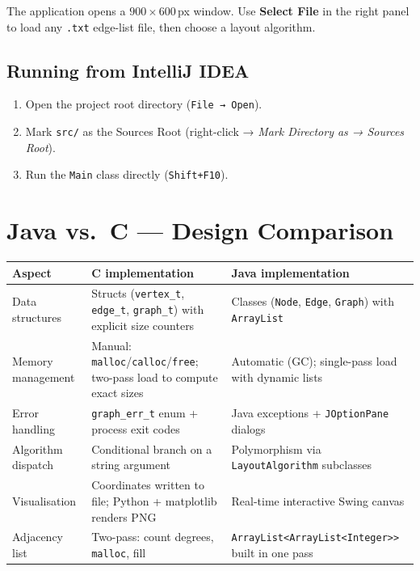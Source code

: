 \documentclass[12pt,a4paper]{article}
\begin{document}
The application opens a $900 \times 600$\,px window. Use
\textbf{Select File} in the right panel to load any \texttt{.txt}
edge-list file, then choose a layout algorithm.

\subsection{Running from IntelliJ IDEA}

\begin{enumerate}
  \item Open the project root directory (\texttt{File → Open}).
  \item Mark \texttt{src/} as the Sources Root
        (right-click → \textit{Mark Directory as → Sources Root}).
  \item Run the \texttt{Main} class directly (\texttt{Shift+F10}).
\end{enumerate}

\section{Java vs.\ C — Design Comparison}

\begin{center}
\begin{tabular}{p{3.5cm}p{5cm}p{5cm}}
\toprule
\textbf{Aspect} & \textbf{C implementation} & \textbf{Java implementation} \\
\midrule
Data structures  &
  Structs (\texttt{vertex\_t}, \texttt{edge\_t}, \texttt{graph\_t}) with
  explicit size counters &
  Classes (\texttt{Node}, \texttt{Edge}, \texttt{Graph}) with
  \texttt{ArrayList} \\
\addlinespace
Memory management &
  Manual: \texttt{malloc}/\texttt{calloc}/\texttt{free};
  two-pass load to compute exact sizes &
  Automatic (GC); single-pass load with dynamic lists \\
\addlinespace
Error handling &
  \texttt{graph\_err\_t} enum + process exit codes &
  Java exceptions + \texttt{JOptionPane} dialogs \\
\addlinespace
Algorithm dispatch &
  Conditional branch on a string argument &
  Polymorphism via \texttt{LayoutAlgorithm} subclasses \\
\addlinespace
Visualisation &
  Coordinates written to file; Python + matplotlib renders PNG &
  Real-time interactive Swing canvas \\
\addlinespace
Adjacency list &
  Two-pass: count degrees, \texttt{malloc}, fill &
  \texttt{ArrayList<ArrayList<Integer>>} built in one pass \\
\bottomrule
\end{tabular}
\end{center}

\end{document}
